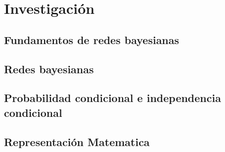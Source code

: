\section{Investigación}

\subsection{Fundamentos de redes bayesianas}


\subsection*{Redes bayesianas}


\subsection*{Probabilidad condicional e independencia condicional}


\subsection*{Representación Matematica}

